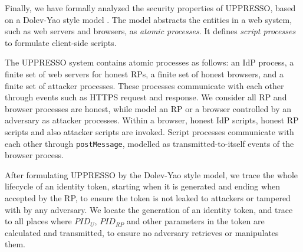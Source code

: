 

\vspace{1mm}
Finally, we have formally analyzed the security properties of UPPRESSO, %
     based on a Dolev-Yao style model \cite{SPRESSO}.
The model abstracts the entities in a web system,
    such as web servers and browsers,
    as \emph{atomic processes}. %
It defines \emph{script processes} to formulate client-side scripts.




The UPPRESSO system contains atomic processes as follows:
an IdP process,
    a finite set of web servers for honest RPs, a finite set of honest browsers, and a finite set of attacker processes.
These processes communicate with each other through events such as HTTPS request and response.
We consider all RP and browser processes are honest,
 while model an RP or a browser controlled by an adversary as attacker processes.
Within a browser,
 honest IdP scripts, honest RP scripts and also attacker scripts are invoked.
Script processes communicate with each other through \verb+postMessage+,
    modelled as transmitted-to-itself events of the browser process.


After formulating UPPRESSO by the Dolev-Yao style model,
    we trace the whole lifecycle of an identity token,
        starting when it is generated and ending when accepted by the RP,
 to ensure the token is not leaked to attackers or tampered with by any adversary.
We locate the generation of an identity token, and trace to all places
    where $PID_U$, $PID_{RP}$ and other parameters in the token are calculated and transmitted,
     to ensure no adversary retrieves or manipulates them.

